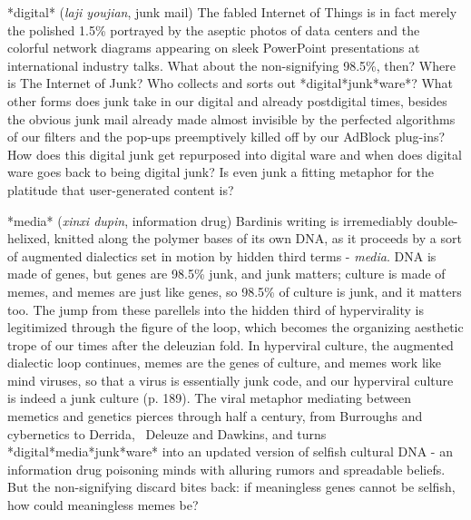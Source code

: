 *digital*\newline
{} (\textit{laji youjian}, junk
mail)\newline
The fabled Internet of Things is in fact merely the polished 1.5\%
portrayed by the aseptic photos of data centers and the colorful
network diagrams appearing on sleek PowerPoint presentations at
international industry talks. What about the non-signifying 98.5\%,
then? Where is The Internet of Junk? Who collects and sorts out
*digital*junk*ware*? What other forms does junk take in our digital and
already postdigital times, besides the obvious junk mail already made
almost invisible by the perfected algorithms of our filters and the
pop-ups preemptively killed off by our AdBlock plug-ins? How does this
digital junk get repurposed into digital ware and when does digital
ware goes back to being digital junk? Is even junk a fitting metaphor
for the platitude that user-generated content is?

*media*\newline
{} (\textit{xinxi dupin},
information drug)\newline
Bardini{\textquotesingle}s writing is irremediably double-helixed,
knitted along the polymer bases of its own DNA, as it proceeds by a
sort of augmented dialectics set in motion by hidden third terms -
\textit{media}. DNA is made of genes, but genes are 98.5\%
junk, and junk matters; culture is made of memes, and memes are just
like genes, so 98.5\% of culture is junk, and it matters too. The jump
from these parellels into the hidden third of hypervirality is
legitimized through the figure of the loop, which becomes the
organizing aesthetic trope of our times after the deleuzian fold. In
hyperviral culture, the augmented dialectic loop continues, memes are
the genes of culture, and memes work like mind viruses, so that
{\textquotedbl}a virus is essentially junk code, and our hyperviral
culture is indeed a junk culture{\textquotedbl} (p. 189). The viral
metaphor mediating between memetics and genetics pierces through half a
century, from Burroughs and cybernetics to Derrida,~ Deleuze and
Dawkins, and turns *digital*media*junk*ware* into an updated version of
selfish cultural DNA - an information drug poisoning minds with
alluring rumors and spreadable beliefs. But the non-signifying discard
bites back: if meaningless genes cannot be selfish, how could
meaningless memes be?

